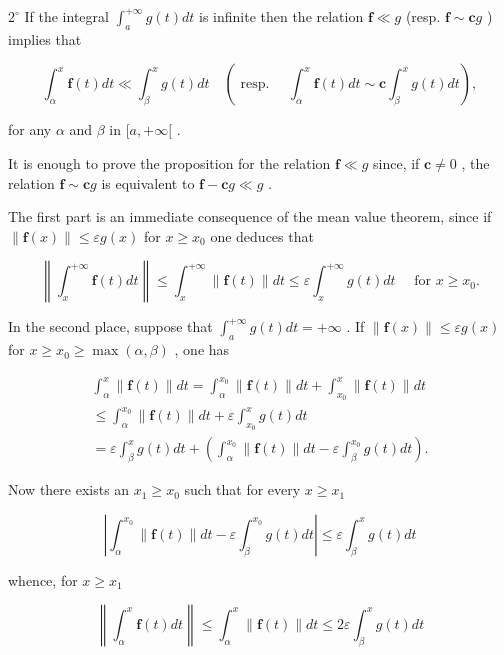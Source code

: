 \(2^{\circ}\) If the integral \(\int_{a}^{+\infty} g(t) dt\) is infinite then the relation \(\mathbf{f} \ll g\) (resp. \(\mathbf{f} \sim \mathbf{c}g\) ) implies that

\[
\int_ {\alpha} ^ {x} \mathbf {f} (t) d t \ll \int_ {\beta} ^ {x} g (t) d t \quad (\text { resp. } \quad \int_ {\alpha} ^ {x} \mathbf {f} (t) d t \sim \mathbf {c} \int_ {\beta} ^ {x} g (t) d t),
\]

for any \(\alpha\) and \(\beta\) in \([a, +\infty[\) .

It is enough to prove the proposition for the relation \(\mathbf{f} \ll g\) since, if \(\mathbf{c} \neq 0\) , the relation \(\mathbf{f} \sim \mathbf{c}g\) is equivalent to \(\mathbf{f} - \mathbf{c}g \ll g\) .

The first part is an immediate consequence of the mean value theorem, since if \(\|\mathbf{f}(x)\| \leqslant \varepsilon g(x)\) for \(x \geqslant x_{0}\) one deduces that

\[
\left\| \int_ {x} ^ {+ \infty} \mathbf {f} (t) d t \right\| \leqslant \int_ {x} ^ {+ \infty} \| \mathbf {f} (t) \| d t \leqslant \varepsilon \int_ {x} ^ {+ \infty} g (t) d t \quad \text { for } x \geqslant x _ {0}.
\]

In the second place, suppose that \(\int_{a}^{+\infty} g(t) dt = +\infty\) . If \(\| \mathbf{f}(x) \| \leqslant \varepsilon g(x)\) for \(x \geqslant x_0 \geqslant \max(\alpha, \beta)\) , one has

\[
\begin{array}{l} \int_ {\alpha} ^ {x} \| \mathbf {f} (t) \| d t = \int_ {\alpha} ^ {x _ {0}} \| \mathbf {f} (t) \| d t + \int_ {x _ {0}} ^ {x} \| \mathbf {f} (t) \| d t \\ \leqslant \int_ {\alpha} ^ {x _ {0}} \| \mathbf {f} (t) \| d t + \varepsilon \int_ {x _ {0}} ^ {x} g (t) d t \\ = \varepsilon \int_ {\beta} ^ {x} g (t) d t + \left(\int_ {\alpha} ^ {x _ {0}} \| \mathbf {f} (t) \| d t - \varepsilon \int_ {\beta} ^ {x _ {0}} g (t) d t\right). \end{array}
\]

Now there exists an \(x_{1} \geqslant x_{0}\) such that for every \(x \geqslant x_{1}\)

\[
\left| \int_ {\alpha} ^ {x _ {0}} \| \mathbf {f} (t) \| d t - \varepsilon \int_ {\beta} ^ {x _ {0}} g (t) d t \right| \leqslant \varepsilon \int_ {\beta} ^ {x} g (t) d t
\]

whence, for \(x \geqslant x_1\)

\[
\left\| \int_ {\alpha} ^ {x} \mathbf {f} (t) d t \right\| \leqslant \int_ {\alpha} ^ {x} \| \mathbf {f} (t) \| d t \leqslant 2 \varepsilon \int_ {\beta} ^ {x} g (t) d t
\]

